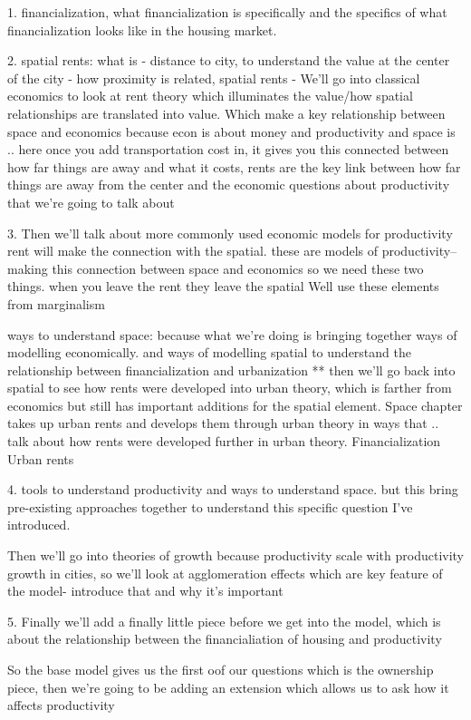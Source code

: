 \documentclass[]{article}
\begin{document}
1. financialization, what financialization is  specifically  and  the specifics of what financialization looks like in the housing market.

2. spatial rents: what is - distance to city, to understand the value at the center of the city - how proximity is related, spatial rents - We'll go into classical economics to look at rent theory which illuminates the value/how spatial relationships are translated into value. Which make a key relationship between space and economics because econ is about money and productivity and space is .. here once you add transportation cost in, it gives you this connected between how far things are away and what it costs, rents are the key link between how far things are away from the center and the economic questions about productivity  that we're going to talk about

3. Then we'll talk about more commonly used economic models for productivity
rent will make the connection with the spatial. 
these are models of productivity-- making this connection between space and economics so we need these two things.
when you leave the rent they leave the spatial
Well use these elements from marginalism

 ways to understand space: because what we’re doing is bringing together ways of modelling economically. and ways of modelling spatial to understand the relationship between financialization and urbanization **
then we'll go back into spatial to see how rents were developed into urban theory, which is farther from economics but still has important additions for the spatial element. 
Space chapter takes up urban rents and develops them through urban theory in ways that .. talk about how rents were developed further in urban theory.
Financialization
Urban rents

4. tools to understand productivity and ways to understand space. but this bring pre-existing approaches together to understand this specific question I've introduced.


Then we'll go into theories of growth because productivity scale with productivity growth in cities, so we'll look at agglomeration effects which are key feature of the model- introduce that and why it's important

5. Finally  we'll add a finally little piece before we get  into the model,  which is about the relationship between the financialiation of housing and productivity

So the base model gives us the first oof our questions which is the ownership piece, then we're going to be adding an extension which allows us to ask how it affects productivity
\end{document}
